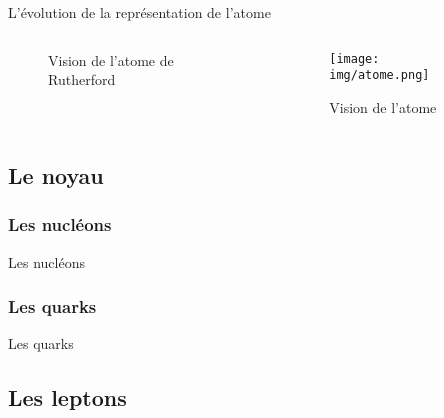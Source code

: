 \documentclass[handout,8pt]{beamer} %
\begin{document}
\begin{frame}{L'évolution de la représentation de l'atome}
\begin{columns}
\begin{column}{0.3\textwidth}
\begin{figure}
			\caption{Vision de l'atome de Rutherford}
		\end{figure}
	\end{column}
	
	\begin{column}{0.4\textwidth}
		\begin{figure}
			\texttt{[image: img/atome.png]} 
			\caption{Vision de l'atome}
		\end{figure}
	\end{column}
\end{columns}

\end{frame}


\subsection{Le noyau}

\subsubsection{Les nucléons}
\begin{frame}{Les nucléons}

\end{frame}

\subsubsection{Les quarks}
\begin{frame}{Les quarks}

\end{frame}

\subsection{Les leptons}
\end{document}
